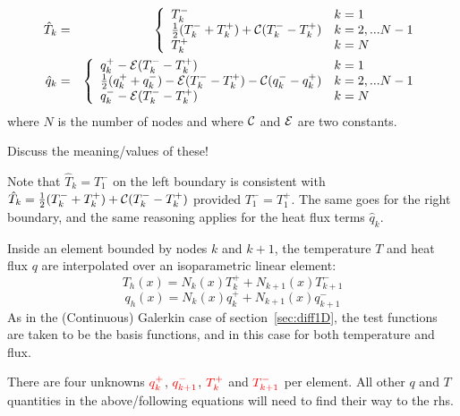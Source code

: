 \begin{eqnarray}
\hat{T}_k &=&
\left\{
\begin{array}{ll}
T_k^-   & k=1 \\ 
\frac{1}{2}(T_k^-+T_k^+) + {\cal C} (T_k^- - T_k^+) & k=2,...N-1\\
T_k^+    & k=N \\ 
\end{array}
\right. \nonumber\\
\hat{q}_k &=&
\left\{
\begin{array}{ll}
q_k^+ -{\cal E} (T_k^--T_k^+)  & k=1 \\ 
\frac{1}{2}(q_k^+ + q_k^-) - {\cal E} (T_k^- - T_k^+) - {\cal C}(q_k^- - q_k^+) & k=2,...N-1\\
q_k^- -{\cal E} (T_k^--T_k^+)    & k=N \\ 
\end{array}
\right.
\end{eqnarray}
where $N$ is the number of nodes and where ${\cal C}$ and ${\cal E}$ are two constants. 

{\color{green} Discuss the meaning/values of these!}

\begin{remark}
Note that $\hat{T}_k=T_1^-$ on the left boundary is consistent with 
$\hat{T}_k=\frac{1}{2}(T_k^-+T_k^+) + {\cal C} (T_k^- - T_k^+)$ provided $T_1^-=T_1^+$.
The same goes for the right boundary, and the same reasoning applies for the heat flux terms $\hat{q}_k$. 
\end{remark}

Inside an element bounded by nodes $k$ and $k+1$, 
the temperature $T$ and heat flux $q$ are interpolated over an isoparametric linear element:
\[
T_h(x) = N_k(x) T_k^+ + N_{k+1}(x)T_{k+1}^-
\]
\[
q_h(x) = N_k(x) q_k^+ + N_{k+1}(x)q_{k+1}^-
\]
As in the (Continuous) Galerkin case of section~\ref{sec:diff1D}, the test functions are taken to 
be the basis functions, and in this case for both temperature and flux. 

There are four unknowns ${\color{red} q_k^+}$, ${\color{red} q_{k+1}^-}$, 
${\color{red}T_k^+}$ and ${\color{red}T_{k+1}^-}$ per element. 
All other $q$ and $T$ quantities in the above/following equations will need to find their way to the rhs. 


